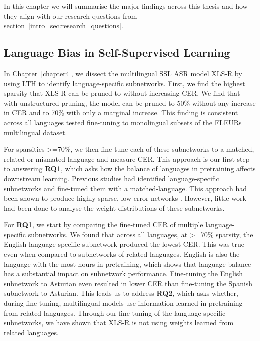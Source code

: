 In this chapter we will summarise the major findings across this thesis and how they align with our research questions from section~\ref{intro_sec:research_questions}.

\subsection{Language Bias in Self-Supervised Learning}

In Chapter~\ref{chapter4}, we dissect the multilingual SSL ASR model XLS-R \cite{babu2021xlsr} by using LTH \cite{frankle2018LTH} to identify language-specific subnetworks. First, we find the highest sparsity that XLS-R can be pruned to without increasing CER. We find that with unstructured pruning, the model can be pruned to 50\% without any increase in CER and to 70\% with only a marginal increase. This finding is consistent across all languages tested fine-tuning to monolingual subsets of the FLEURs \cite{FLEURS} multilingual dataset.

For sparsities >=70\%, we then fine-tune each of these subnetworks to a matched, related or mismated language and measure CER. This approach is our first step to answering \textbf{RQ1}, which asks how the balance of languages in pretraining affects downstream learning. Previous studies had identified language-specific subnetworks and fine-tuned them with a matched-language. This approach had been shown to produce highly sparse, low-error networks \cite{PARP, Lu_Language_adap_xlsr, yang2023learning}. However, little work had been done to analyse the weight distributions of these subnetworks. %

For \textbf{RQ1}, we start by comparing the fine-tuned CER of multiple language-specific subnetworks. We found that across all languages, at >=70\% sparsity, the English language-specific subnetwork produced the lowest CER. This was true even when compared to subnetworks of related languages. English is also the language with the most hours in pretraining, which shows that language balance has a substantial impact on subnetwork performance. Fine-tuning the English subnetwork to Asturian even resulted in lower CER than fine-tuning the Spanish subnetwork to Asturian. This leads us to address \textbf{RQ2}, which asks whether, during fine-tuning, multilingual models use information learned in pretraining from related languages. Through our fine-tuning of the language-specific subnetworks, we have shown that XLS-R is not using weights learned from related languages. 


